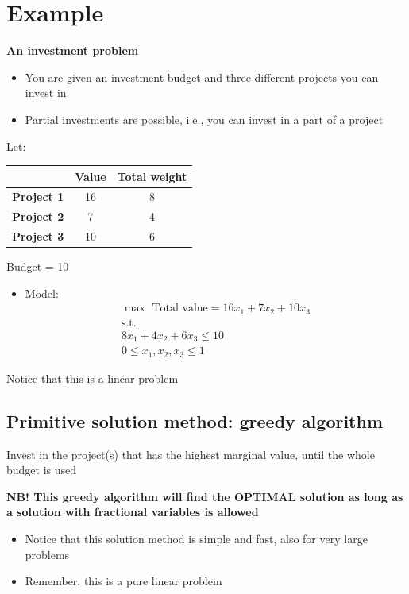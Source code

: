 \documentclass[10pt]{article}
\begin{document}
\section{Example}
\textbf{An investment problem}
\begin{itemize}
    \item You are given an investment budget and three different projects you can invest in 
    \item Partial investments are possible, i.e., you can invest in a part of a project 
\end{itemize}
Let: 
\begin{center}
    \begin{tabular}{|c|c|c|}
        \hline 
        & \textbf{Value} & \textbf{Total weight}\\\hline 
        \textbf{Project 1} & 16 & 8\\\hline
        \textbf{Project 2} & 7 & 4\\\hline
        \textbf{Project 3} & 10 & 6\\\hline
    \end{tabular}
\end{center}
Budget = 10
\begin{itemize}
    \item Model: 
    \begin{gather*}
        \max \text{ Total value} = 16x_1 + 7x_2 + 10x_3\\
        \text{s.t.}\\
        8x_1 + 4x_2 + 6x_3 \le 10\\
        0 \le x_1, x_2, x_3 \le 1
    \end{gather*}
\end{itemize}
Notice that this is a linear problem 

\subsection{Primitive solution method: greedy algorithm}
Invest in the project(s) that has the highest marginal value, until the whole budget is used

\textbf{NB! This greedy algorithm will find the OPTIMAL solution as long as a solution with fractional variables is allowed}
\begin{itemize}
    \item Notice that this solution method is simple and fast, also for very large problems 
    \item Remember, this is a pure linear problem 
\end{itemize}
\newpage
\end{document}
